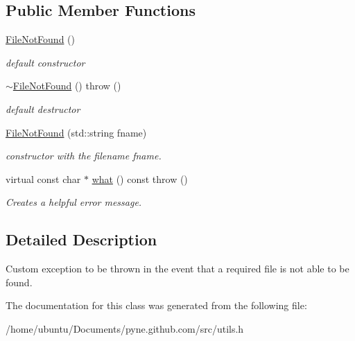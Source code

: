 \subsection*{Public Member Functions}
\begin{DoxyCompactItemize}
\item 
\hyperlink{classpyne_1_1_file_not_found_aaae1bdf04df2b68377ae453929c8eb56}{File\+Not\+Found} ()\hypertarget{classpyne_1_1_file_not_found_aaae1bdf04df2b68377ae453929c8eb56}{}\label{classpyne_1_1_file_not_found_aaae1bdf04df2b68377ae453929c8eb56}

\begin{DoxyCompactList}\small\item\em default constructor \end{DoxyCompactList}\item 
\hyperlink{classpyne_1_1_file_not_found_abc00e9c8711bb1b1bb2dc1dfd3a98745}{$\sim$\+File\+Not\+Found} ()  throw ()\hypertarget{classpyne_1_1_file_not_found_abc00e9c8711bb1b1bb2dc1dfd3a98745}{}\label{classpyne_1_1_file_not_found_abc00e9c8711bb1b1bb2dc1dfd3a98745}

\begin{DoxyCompactList}\small\item\em default destructor \end{DoxyCompactList}\item 
\hyperlink{classpyne_1_1_file_not_found_a4d766115c01634b77aebe42269f9aead}{File\+Not\+Found} (std\+::string fname)\hypertarget{classpyne_1_1_file_not_found_a4d766115c01634b77aebe42269f9aead}{}\label{classpyne_1_1_file_not_found_a4d766115c01634b77aebe42269f9aead}

\begin{DoxyCompactList}\small\item\em constructor with the filename {\itshape fname}. \end{DoxyCompactList}\item 
virtual const char $\ast$ \hyperlink{classpyne_1_1_file_not_found_a55d410139d5853e8988d073637845cbd}{what} () const   throw ()\hypertarget{classpyne_1_1_file_not_found_a55d410139d5853e8988d073637845cbd}{}\label{classpyne_1_1_file_not_found_a55d410139d5853e8988d073637845cbd}

\begin{DoxyCompactList}\small\item\em Creates a helpful error message. \end{DoxyCompactList}\end{DoxyCompactItemize}


\subsection{Detailed Description}
Custom exception to be thrown in the event that a required file is not able to be found. 

The documentation for this class was generated from the following file\+:\begin{DoxyCompactItemize}
\item 
/home/ubuntu/\+Documents/pyne.\+github.\+com/src/utils.\+h\end{DoxyCompactItemize}
